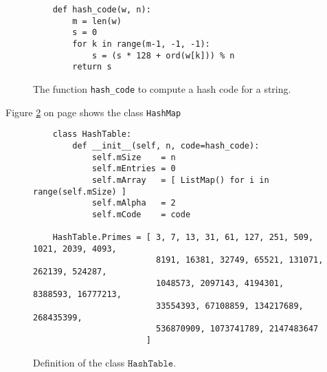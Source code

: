 \begin{figure}[!ht]
\centering
\begin{verbatim}
    def hash_code(w, n):
        m = len(w)
        s = 0
        for k in range(m-1, -1, -1):
            s = (s * 128 + ord(w[k])) % n
        return s
\end{verbatim}
\vspace*{-0.3cm}
\caption{The function \texttt{hash\_code} to compute a hash code for a string.}
\label{fig:hash_code.py}
\end{figure}
\pagebreak

\noindent
Figure \ref{fig:HashMap.ipynb} on page \pageref{fig:HashMap.ipynb} shows the class \texttt{HashMap}

\begin{figure}[!ht]
  \centering
\begin{verbatim}
    class HashTable:
        def __init__(self, n, code=hash_code):
            self.mSize    = n
            self.mEntries = 0                                        
            self.mArray   = [ ListMap() for i in range(self.mSize) ] 
            self.mAlpha   = 2                                        
            self.mCode    = code

    HashTable.Primes = [ 3, 7, 13, 31, 61, 127, 251, 509, 1021, 2039, 4093, 
                         8191, 16381, 32749, 65521, 131071, 262139, 524287, 
                         1048573, 2097143, 4194301, 8388593, 16777213, 
                         33554393, 67108859, 134217689, 268435399, 
                         536870909, 1073741789, 2147483647 
                       ]        
\end{verbatim}
\vspace*{-0.3cm}
  \caption{Definition of the class $\texttt{HashTable}$.}
  \label{fig:HashMap.ipynb}
\end{figure}

